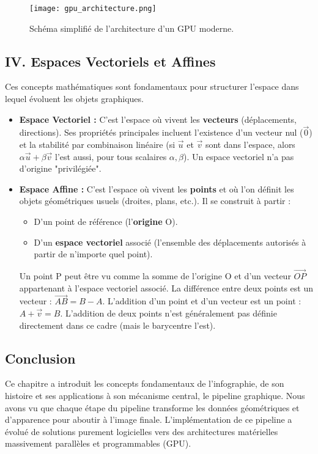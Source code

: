 \documentclass{article}
\begin{document}
\begin{figure}[H]
\centering
\texttt{[image: gpu\_architecture.png]}
\caption{Schéma simplifié de l'architecture d'un GPU moderne.}
\label{fig:gpu_architecture}
\end{figure}

\subsection{IV. Espaces Vectoriels et Affines}

Ces concepts mathématiques sont fondamentaux pour structurer l'espace dans lequel évoluent les objets graphiques.

\begin{itemize}
    \item \textbf{Espace Vectoriel :} C'est l'espace où vivent les \textbf{vecteurs} (déplacements, directions). Ses propriétés principales incluent l'existence d'un vecteur nul ($\vec{0}$) et la stabilité par combinaison linéaire (si $\vec{u}$ et $\vec{v}$ sont dans l'espace, alors $\alpha \vec{u} + \beta \vec{v}$ l'est aussi, pour tous scalaires $\alpha, \beta$). Un espace vectoriel n'a pas d'origine "privilégiée".
    \item \textbf{Espace Affine :} C'est l'espace où vivent les \textbf{points} et où l'on définit les objets géométriques usuels (droites, plans, etc.). Il se construit à partir :
    \begin{itemize}
        \item D'un point de référence (l'\textbf{origine} O).
        \item D'un \textbf{espace vectoriel} associé (l'ensemble des déplacements autorisés à partir de n'importe quel point).
    \end{itemize}
    Un point P peut être vu comme la somme de l'origine O et d'un vecteur $\vec{OP}$ appartenant à l'espace vectoriel associé. La différence entre deux points est un vecteur : $\vec{AB} = B - A$. L'addition d'un point et d'un vecteur est un point : $A + \vec{v} = B$. L'addition de deux points n'est généralement pas définie directement dans ce cadre (mais le barycentre l'est).
\end{itemize}


\subsection{Conclusion}

Ce chapitre a introduit les concepts fondamentaux de l'infographie, de son histoire et ses applications à son mécanisme central, le pipeline graphique. Nous avons vu que chaque étape du pipeline transforme les données géométriques et d'apparence pour aboutir à l'image finale. L'implémentation de ce pipeline a évolué de solutions purement logicielles vers des architectures matérielles massivement parallèles et programmables (GPU).
\end{document}
